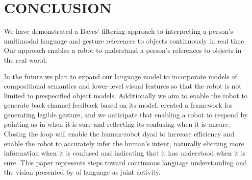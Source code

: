 \documentclass[letterpaper, 10 pt, conference]{ieeeconf}
\begin{document}
\section{CONCLUSION}

We have demonstrated a Bayes' filtering approach to interpreting a
person's multimodal language and gesture references to objects
continuously in real time.  Our approach enables a robot to understand
a person's references to objects in the real world.

In the future we plan to expand our language model to incorporate
models of compositional semantics and lower-level visual features so
that the robot is not limited to prespecified object models.
Additionally we aim to enable the robot to generate back-channel
feedback based on its model.  \citet{dragan13} created a framework for
generating legible gesture, and we anticipate that enabling a robot to
respond by pointing as in \citet{holladay14} when it is sure and
reflecting its confusing when it is unsure.  Closing the loop will
enable the human-robot dyad to increase efficiency and enable the
robot to accurately infer the human's intent, naturally eliciting more
information when it is confused and indicating that it has understood
when it is sure.  This paper represents steps toward continuous
language understanding and the vision presented by \citet{clark96} of
language as joint activity.




\end{document}

